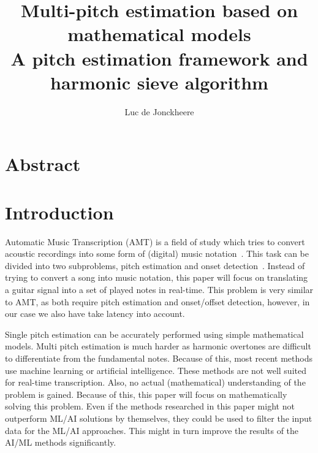 \documentclass[10pt,twocolumn]{article}
\title{\textbf{Multi-pitch estimation based on mathematical models}\\A pitch estimation framework and harmonic sieve algorithm}
\author{Luc de Jonckheere}
\begin{document}

\maketitle


\section*{Abstract}



\section{Introduction}
Automatic Music Transcription (AMT) is a field of study which tries to convert acoustic recordings into some form of (digital) music notation~\cite{survey1}. This task can be divided into two subproblems, pitch estimation and onset detection~\cite{survey2}. Instead of trying to convert a song into music notation, this paper will focus on translating a guitar signal into a set of played notes in real-time. This problem is very similar to AMT, as both require pitch estimation and onset/offset detection, however, in our case we also have take latency into account.

Single pitch estimation can be accurately performed using simple mathematical models. Multi pitch estimation is much harder as harmonic overtones are difficult to differentiate from the fundamental notes. Because of this, most recent methods use machine learning or artificial intelligence. These methods are not well suited for real-time transcription. Also, no actual (mathematical) understanding of the problem is gained. Because of this, this paper will focus on mathematically solving this problem. Even if the methods researched in this paper might not outperform ML/AI solutions by themselves, they could be used to filter the input data for the ML/AI approaches. This might in turn improve the results of the AI/ML methods significantly.
\end{document}
